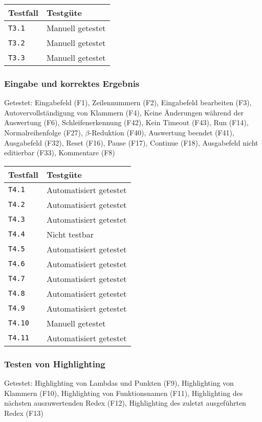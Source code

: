 \documentclass[parskip=full,11pt,twoside]{scrartcl}
\newcommand{\testline}[2]{
    \texttt{#1} & 
    \ifthenelse{\equal{#2}{Nicht getestet}}
        {\cellcolor{red!20}}
        {}
    \ifthenelse{\equal{#2}{Manuell getestet}}
        {\cellcolor{LimeGreen!20}}
        {}
    \ifthenelse{\equal{#2}{Automatisiert getestet}}
        {\cellcolor{green!20}}
        {}
    \ifthenelse{\equal{#2}{Nicht testbar}}
    {\cellcolor{gray!20}}
     {}
    #2 \\ \hline
}
\begin{document}
    \label{shortcuts}
    \begin{center}
        \begin{tabular}{ p{9cm} p{4cm}}
            Testfall & Testgüte \\ \hline
            \testline{T3.1}{Manuell getestet}
            \testline{T3.2}{Manuell getestet}
            \testline{T3.3}{Manuell getestet}
        \end{tabular}
    \end{center}

\subsubsection{Eingabe und korrektes Ergebnis}
    Getestet:
    Eingabefeld (F1),
    Zeilennummern (F2),
    Eingabefeld bearbeiten (F3),
    Autovervollständigung von Klammern (F4),
    Keine Änderungen während der Auswertung (F6),
    Schleifenerkennung (F42),
    Kein Timeout (F43),
    Run (F14),
    Normalreihenfolge (F27),
    $\beta$-Reduktion (F40),
    Auswertung beendet (F41),
    Ausgabefeld (F32),
    Reset (F16),
    Pause (F17),
    Continue (F18),
    Ausgabefeld nicht editierbar (F33),
    Kommentare (F8)

    \label{shortcuts}
    \begin{center}
        \begin{tabular}{ p{9cm} p{4cm}}
            Testfall & Testgüte \\ \hline
            \testline{T4.1}{Automatisiert getestet}
            \testline{T4.2}{Automatisiert getestet}
            \testline{T4.3}{Automatisiert getestet}
            \testline{T4.4}{Nicht testbar}
            \testline{T4.5}{Automatisiert getestet}
            \testline{T4.6}{Automatisiert getestet}
            \testline{T4.7}{Automatisiert getestet}
            \testline{T4.8}{Automatisiert getestet}
            \testline{T4.9}{Automatisiert getestet}
            \testline{T4.10}{Manuell getestet}
            \testline{T4.11}{Automatisiert getestet}
        \end{tabular}
    \end{center}

\subsubsection{Testen von Highlighting}
    Getestet:
    Highlighting von Lambdas und Punkten (F9),
    Highlighting von Klammern (F10),
    Highlighting von Funktionsnamen (F11),
    Highlighting des nächsten auszuwertenden Redex (F12),
    Highlighting des zuletzt ausgeführten Redex (F13)
\end{document}
